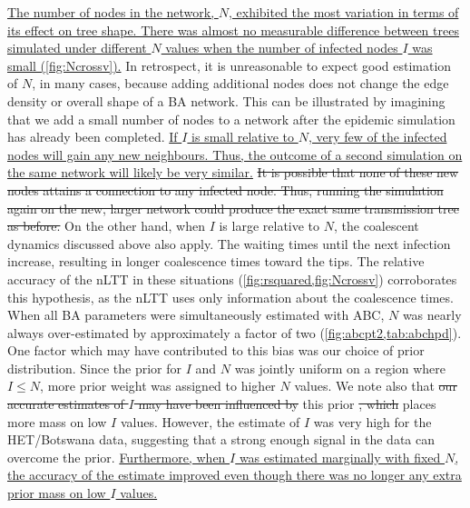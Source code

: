 \documentclass[12pt]{article}\usepackage[]{graphicx}\usepackage[]{color}
\let\mref\cref
\renewcommand{\cref}[1]{\mbox{\mref{#1}}}
\newcommand{\add}[1]{\color{blue} \uline{#1} \color{black}}
\newcommand{\del}[1]{\color{red} \sout{#1} \color{black}}
\begin{document}
\add{The number of nodes in the network, $N$, exhibited the most variation in
terms of its effect on tree shape. There was almost no measurable difference
between trees simulated under different $N$ values when the number of infected
nodes $I$ was small (\cref{fig:Ncrossv}).} In retrospect, it is unreasonable to
expect good estimation of $N$, in many cases, because adding additional nodes
does not change the edge density or overall shape of a BA network. This can be
illustrated by imagining that we add a small number of nodes to a network after
the epidemic simulation has already been completed. \add{If $I$ is small
relative to $N$, very few of the infected nodes will gain any new neighbours.
Thus, the outcome of a second simulation on the same network will likely be
very similar.} \del{It is possible that none of these new nodes attains a
connection to any infected node. Thus, running the simulation again on the new,
larger network could produce the exact same transmission tree as before.}
On the other hand, when $I$ is large relative to $N$, the coalescent dynamics
discussed above also apply. The waiting times until the next infection
increase, resulting in longer coalescence times toward the tips. The relative
accuracy of the nLTT in these situations (\cref{fig:rsquared,fig:Ncrossv})
corroborates this hypothesis, as the nLTT uses only information about the
coalescence times. When all BA parameters were simultaneously estimated with
ABC, $N$ was nearly always over-estimated by approximately a factor of two
(\cref{fig:abcpt2,tab:abchpd}). One factor which may have contributed to this
bias was our choice of prior distribution. Since the prior for $I$ and $N$ was
jointly uniform on a region where $I \leq N$, more prior weight was assigned to
higher $N$ values. We note also that \del{our accurate estimates of $I$ may
have been influenced by} this prior\del{, which} places more mass on low $I$
values. However, the estimate of $I$ was very high for the HET/Botswana data,
suggesting that a strong enough signal in the data can overcome the prior.
\add{Furthermore, when $I$ was estimated marginally with fixed $N$, the
accuracy of the estimate improved even though there was no longer any extra
prior mass on low $I$ values.}
\end{document}
